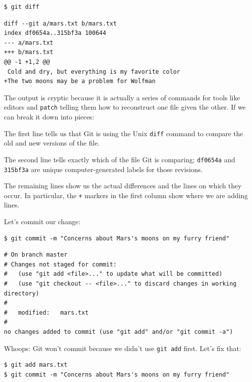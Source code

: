 \documentclass{book}
\begin{document}
\begin{verbatim}
$ git diff
\end{verbatim}

\begin{verbatim}
diff --git a/mars.txt b/mars.txt
index df0654a..315bf3a 100644
--- a/mars.txt
+++ b/mars.txt
@@ -1 +1,2 @@
 Cold and dry, but everything is my favorite color
+The two moons may be a problem for Wolfman
\end{verbatim}

The output is cryptic because it is actually a series of commands for
tools like editors and \texttt{patch} telling them how to reconstruct
one file given the other. If we can break it down into pieces:

\begin{swcenumerate}
\item
  The first line tells us that Git is using the Unix \texttt{diff}
  command to compare the old and new versions of the file.
\item
  The second line tells exactly which 
  of the file Git is comparing; \texttt{df0654a} and \texttt{315bf3a}
  are unique computer-generated labels for those revisions.
\item
  The remaining lines show us the actual differences and the lines on
  which they occur. In particular, the \texttt{+} markers in the first
  column show where we are adding lines.
\end{swcenumerate}

Let's commit our change:

\begin{verbatim}
$ git commit -m "Concerns about Mars's moons on my furry friend"
\end{verbatim}

\begin{verbatim}
# On branch master
# Changes not staged for commit:
#   (use "git add <file>..." to update what will be committed)
#   (use "git checkout -- <file>..." to discard changes in working directory)
#
#   modified:   mars.txt
#
no changes added to commit (use "git add" and/or "git commit -a")
\end{verbatim}

Whoops: Git won't commit because we didn't use \texttt{git add} first.
Let's fix that:

\begin{verbatim}
$ git add mars.txt
$ git commit -m "Concerns about Mars's moons on my furry friend"
\end{verbatim}
\end{document}
